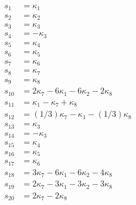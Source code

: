 \documentclass[11pt]{article}
\begin{document}
\begin{align}
s_{1} &= \kappa_1\\
s_{2} &= \kappa_2\\
s_{3} &= \kappa_3\\
s_{4} &= -\kappa_3\\
s_{5} &= \kappa_4\\
s_{6} &= \kappa_5\\
s_{7} &= \kappa_6\\
s_{8} &= \kappa_7\\
s_{9} &= \kappa_8\\
s_{10} &= 2  \kappa_7 - 6  \kappa_1 - 6  \kappa_2 - 2  \kappa_8\\
s_{11} &= \kappa_1 - \kappa_7 + \kappa_8\\
s_{12} &= (1/3)  \kappa_7 - \kappa_1 - (1/3)  \kappa_8\\
s_{13} &= \kappa_3\\
s_{14} &= -\kappa_3\\
s_{15} &= \kappa_4\\
s_{16} &= \kappa_5\\
s_{17} &= \kappa_6\\
s_{18} &= 3  \kappa_7 - 6  \kappa_1 - 6  \kappa_2 - 4  \kappa_8\\
s_{19} &= 2  \kappa_7 - 3  \kappa_1 - 3  \kappa_2 - 3  \kappa_8\\
s_{20} &= 2  \kappa_7 - 2  \kappa_8
\end{align}
\end{document}
